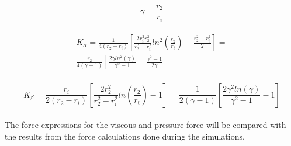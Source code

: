 \begin{equation}
\gamma = \frac{r_2}{r_i}
\label{eq:const_gamma}
\end{equation}\\

\begin{multline}
K_{\alpha} = \frac{1}{4(r_2 - r_i)} \left[ \frac{2r_i^2 r_2^2}{r_2^2 - r_i^2}ln^2(\frac{r_2}{r_i}) - \frac{r_2^2 - r_i^2}{2}\right] = \\
 \frac{r_2}{4(\gamma - 1)} \left[ \frac{2 \gamma ln^2(\gamma)}{\gamma^2 -1} -\frac{\gamma^2 -1}{2 \gamma}\right]
\label{eq:K_alpha}
\end{multline}\\

\begin{equation}
K_{\beta} = \frac{r_i}{2(r_2 - r_i)} \left[ \frac{2r_2^2 }{r_2^2 - r_i^2}ln(\frac{r_2}{r_i}) - 1 \right] = \frac{1}{2(\gamma - 1)} \left[ \frac{2 \gamma^2 ln(\gamma)}{\gamma^2 -1} -1 \right]
\label{eq:K_beta}
\end{equation}\\

\noindent The force expressions for the viscous and pressure force will be compared with the results from the force calculations done during the simulations.
